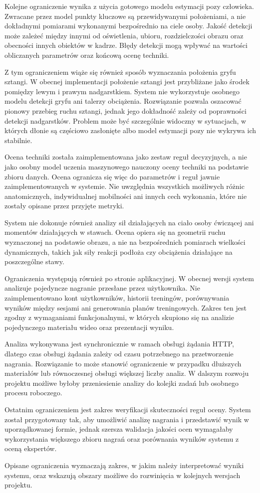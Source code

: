 Kolejne ograniczenie wynika z użycia gotowego modelu estymacji pozy człowieka. Zwracane przez model punkty kluczowe są przewidywanymi położeniami, a nie dokładnymi pomiarami wykonanymi bezpośrednio na ciele osoby. Jakość detekcji może zależeć między innymi od oświetlenia, ubioru, rozdzielczości obrazu oraz obecności innych obiektów w kadrze. Błędy detekcji mogą wpływać na wartości obliczanych parametrów oraz końcową ocenę techniki.

Z tym ograniczeniem wiąże się również sposób wyznaczania położenia gryfu sztangi. W obecnej implementacji położenie sztangi jest przybliżane jako środek pomiędzy lewym i prawym nadgarstkiem. System nie wykorzystuje osobnego modelu detekcji gryfu ani talerzy obciążenia. Rozwiązanie pozwala oszacować pionowy przebieg ruchu sztangi, jednak jego dokładność zależy od poprawności detekcji nadgarstków. Problem może być szczególnie widoczny w sytuacjach, w których dłonie są częściowo zasłonięte albo model estymacji pozy nie wykrywa ich stabilnie.

Ocena techniki została zaimplementowana jako zestaw reguł decyzyjnych, a nie jako osobny model uczenia maszynowego nauczony oceny techniki na podstawie zbioru danych. Ocena ogranicza się więc do parametrów i reguł jawnie zaimplementowanych w systemie. Nie uwzględnia wszystkich możliwych różnic anatomicznych, indywidualnej mobilności ani innych cech wykonania, które nie zostały opisane przez przyjęte metryki.

System nie dokonuje również analizy sił działających na ciało osoby ćwiczącej ani momentów działających w stawach. Ocena opiera się na geometrii ruchu wyznaczonej na podstawie obrazu, a nie na bezpośrednich pomiarach wielkości dynamicznych, takich jak siły reakcji podłoża czy obciążenia działające na poszczególne stawy.

Ograniczenia występują również po stronie aplikacyjnej. W obecnej wersji system analizuje pojedyncze nagranie przesłane przez użytkownika. Nie zaimplementowano kont użytkowników, historii treningów, porównywania wyników między sesjami ani generowania planów treningowych. Zakres ten jest zgodny z wymaganiami funkcjonalnymi, w których skupiono się na analizie pojedynczego materiału wideo oraz prezentacji wyniku.

Analiza wykonywana jest synchronicznie w ramach obsługi żądania HTTP, dlatego czas obsługi żądania zależy od czasu potrzebnego na przetworzenie nagrania. Rozwiązanie to może stanowić ograniczenie w przypadku dłuższych materiałów lub równoczesnej obsługi większej liczby analiz. W dalszym rozwoju projektu możliwe byłoby przeniesienie analizy do kolejki zadań lub osobnego procesu roboczego.

Ostatnim ograniczeniem jest zakres weryfikacji skuteczności reguł oceny. System został przygotowany tak, aby umożliwić analizę nagrania i przedstawić wynik w uporządkowanej formie, jednak szersza walidacja jakości ocen wymagałaby wykorzystania większego zbioru nagrań oraz porównania wyników systemu z oceną ekspertów.

Opisane ograniczenia wyznaczają zakres, w jakim należy interpretować wyniki systemu, oraz wskazują obszary możliwe do rozwinięcia w kolejnych wersjach projektu.
